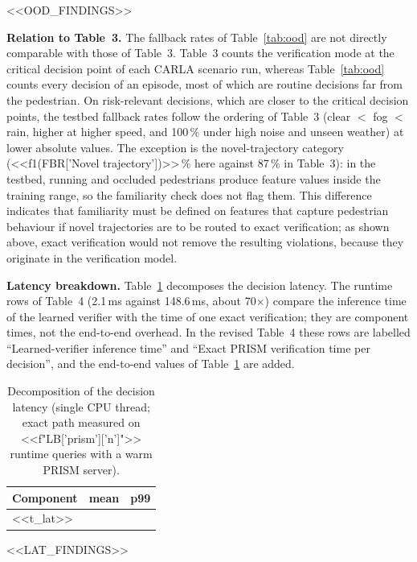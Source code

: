 \documentclass[11pt]{article}
\begin{document}
<<OOD_FINDINGS>>

\textbf{Relation to Table~3.} The fallback rates of Table~\ref{tab:ood} are not directly comparable with those of Table~3. Table~3 counts the
verification mode at the critical decision point of each CARLA scenario run, whereas Table~\ref{tab:ood} counts every decision of an episode,
most of which are routine decisions far from the pedestrian. On risk-relevant decisions, which are closer to the critical decision points, the
testbed fallback rates follow the ordering of Table~3 (clear $<$ fog $<$ rain, higher at higher speed, and 100\,\% under high noise and unseen
weather) at lower absolute values. The exception is the novel-trajectory category (<<f1(FBR['Novel trajectory'])>>\,\% here against 87\,\% in Table~3):
in the testbed, running and occluded pedestrians produce feature values inside the training range, so the familiarity check does not flag them.
This difference indicates that familiarity must be defined on features that capture pedestrian behaviour if novel trajectories are to be routed to
exact verification; as shown above, exact verification would not remove the resulting violations, because they originate in the verification model.

\textbf{Latency breakdown.} Table~\ref{tab:lat} decomposes the decision latency. The runtime rows of Table~4 (2.1\,ms against 148.6\,ms, about
70$\times$) compare the inference time of the learned verifier with the time of one exact verification; they are component times, not the
end-to-end overhead. In the revised Table~4 these rows are labelled ``Learned-verifier inference time'' and ``Exact PRISM verification time per
decision'', and the end-to-end values of Table~\ref{tab:lat} are added.

\begin{table}[h]
\centering\small
\caption{Decomposition of the decision latency (single CPU thread; exact path measured on <<f"{LB['prism']['n']}">> runtime queries with a warm
PRISM server).}\label{tab:lat}
\begin{tabular}{lcc}
\toprule
Component & mean & p99 \\
\midrule
<<t_lat>>
\bottomrule
\end{tabular}
\end{table}

<<LAT_FINDINGS>>

\clearpage
\end{document}
